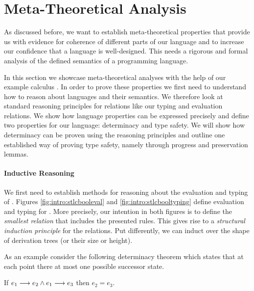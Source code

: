 {%
\section{Meta-Theoretical Analysis}\label{sec:intro:typesafety}


As discussed before, we want to establish meta-theoretical properties that
provide us with evidence for coherence of different parts of our language and to
increase our confidence that a language is well-designed. This needs a rigorous
and formal analysis of the defined semantics of a programming language.

In this section we showcase meta-theoretical analyses with the help of our
example calculus \stlcbool. In order to prove these properties we first need to
understand how to reason about languages and their semantics. We therefore look
at standard reasoning principles for relations like our typing and evaluation
relations. We show how language properties can be expressed precisely and define
two properties for our language: determinacy and type safety. We will show how
determinacy can be proven using the reasoning principles and outline one
established way of proving type safety, namely through progress and preservation
lemmas.


\paragraph{Inductive Reasoning}
We first need to establish methods for reasoning about the evaluation and typing
of \stlcbool. Figures \ref{fig:intro:stlcbooleval} and
\ref{fig:intro:stlcbooltyping} define evaluation and typing for \stlcbool. More
precisely, our intention in both figures is to define the \emph{smallest
  relation} that includes the presented rules. This gives rise to a
\emph{structural induction principle} for the relations. Put differently, we can
induct over the shape of derivation trees (or their size or height).

As an example consider the following determinacy theorem which states that
at each point there at most one possible successor state.
\begin{thm}[Determinacy]
  If ${e_1} \longrightarrow {e_2} \wedge {e_1} \longrightarrow {e_3}$ then $e_2 = e_3$.
\end{thm}

}
